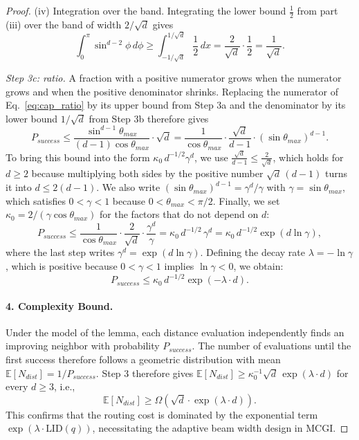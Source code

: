 \documentclass{article}
\theoremstyle{plain}
\theoremstyle{definition}
\theoremstyle{remark}
\begin{document}
\begin{proof}
(iv) Integration over the band. Integrating the lower bound $\frac{1}{2}$ from part (iii) over the band of width $2/\sqrt{d}$ gives
\begin{equation}
    \int_0^{\pi} \sin^{d-2} \phi \, d\phi \ge \int_{-1/\sqrt{d}}^{1/\sqrt{d}} \frac{1}{2} \, dx = \frac{2}{\sqrt{d}} \cdot \frac{1}{2} = \frac{1}{\sqrt{d}}.
\end{equation}

\emph{Step 3c: ratio.} A fraction with a positive numerator grows when the numerator grows and when the positive denominator shrinks. Replacing the numerator of Eq.~\eqref{eq:cap_ratio} by its upper bound from Step 3a and the denominator by its lower bound $1/\sqrt{d}$ from Step 3b therefore gives
\begin{equation}
    P_{success} \le \frac{\sin^{d-1} \theta_{max}}{(d-1) \cos \theta_{max}} \cdot \sqrt{d} = \frac{1}{\cos \theta_{max}} \cdot \frac{\sqrt{d}}{d-1} \cdot (\sin \theta_{max})^{d-1}.
\end{equation}
To bring this bound into the form $\kappa_0\, d^{-1/2} \gamma^{d}$, we use $\frac{\sqrt{d}}{d-1} \le \frac{2}{\sqrt{d}}$, which holds for $d \ge 2$ because multiplying both sides by the positive number $\sqrt{d}\,(d-1)$ turns it into $d \le 2(d-1)$. We also write $(\sin \theta_{max})^{d-1} = \gamma^{d}/\gamma$ with $\gamma = \sin \theta_{max}$, which satisfies $0 < \gamma < 1$ because $0 < \theta_{max} < \pi/2$. Finally, we set $\kappa_0 = 2/(\gamma \cos \theta_{max})$ for the factors that do not depend on $d$:
\begin{equation}
    P_{success} \le \frac{1}{\cos\theta_{max}} \cdot \frac{2}{\sqrt{d}} \cdot \frac{\gamma^{d}}{\gamma} = \kappa_0\, d^{-1/2}\, \gamma^{d} = \kappa_0\, d^{-1/2} \exp(d \ln \gamma),
\end{equation}
where the last step writes $\gamma^d = \exp(d \ln \gamma)$. Defining the decay rate $\lambda = -\ln \gamma$, which is positive because $0 < \gamma < 1$ implies $\ln \gamma < 0$, we obtain:
\begin{equation}
    P_{success} \le \kappa_0\, d^{-1/2} \exp(-\lambda \cdot d).
\end{equation}

\paragraph{4. Complexity Bound.}
Under the model of the lemma, each distance evaluation independently finds an improving neighbor with probability $P_{success}$. The number of evaluations until the first success therefore follows a geometric distribution with mean $\mathbb{E}[N_{dist}] = 1/P_{success}$. Step 3 therefore gives $\mathbb{E}[N_{dist}] \ge \kappa_0^{-1} \sqrt{d}\, \exp(\lambda \cdot d)$ for every $d \ge 3$, i.e.,
\begin{equation}
    \mathbb{E}[N_{dist}] \ge \Omega\left( \sqrt{d} \cdot \exp(\lambda \cdot d) \right).
\end{equation}
This confirms that the routing cost is dominated by the exponential term $\exp(\lambda \cdot \text{LID}(q))$, necessitating the adaptive beam width design in MCGI.
\end{proof}
\end{document}
